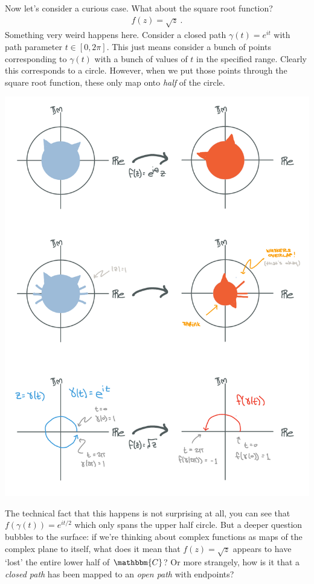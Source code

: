 \documentclass[
  11pt,
	colorful,
	raggedright,
]{tufte-style-thesis-flip}
\begin{document}
Now let's consider a curious case. What about the square root function?
\begin{align}
  f(z) = \sqrt{z} \ .
\end{align}
Something very weird happens here. Consider a closed path $\gamma(t) = e^{it}$ with path parameter $t \in [0,2\pi]$. This just means consider a bunch of points corresponding to $\gamma(t)$ with a bunch of values of $t$ in the specified range. Clearly this corresponds to a circle. However, when we put those points through the square root function, these only map onto \emph{half} of the circle. 
\begin{center}
\includegraphics[width=.7\textwidth]{figures/Complex_04_log.pdf}
\end{center}
The technical fact that this happens is not surprising at all, you can see that $f(\gamma(t)) = e^{it/2}$ which only spans the upper half circle. But a deeper question bubbles to the surface: if we're thinking about complex functions as maps of the complex plane to itself, what does it mean that $f(z) = \sqrt{z}$ appears to have `lost' the entire lower half of $\mathbbm{C}$? Or more strangely, how is it that a \emph{closed path} has been mapped to an \emph{open path} with endpoints?
\end{document}
